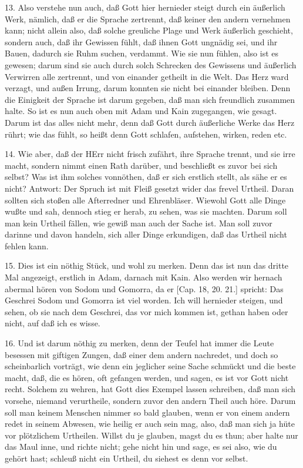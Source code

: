 13. Also verstehe nun auch, daß Gott hier hernieder steigt durch ein äußerlich Werk, nämlich, daß er die Sprache zertrennt, daß keiner den andern vernehmen kann; nicht allein also, daß solche greuliche Plage und Werk äußerlich geschieht, sondern auch, daß ihr Gewissen fühlt, daß ihnen Gott ungnädig sei, und ihr Bauen, dadurch sie Ruhm suchen, verdammt. Wie sie nun fühlen, also ist es gewesen; darum sind sie auch durch solch Schrecken des Gewissens und äußerlich Verwirren alle zertrennt, und von einander getheilt in die Welt. Das Herz ward verzagt, und außen Irrung, darum konnten sie nicht bei einander bleiben. Denn die Einigkeit der Sprache ist darum gegeben, daß man sich freundlich zusammen halte. So ist es nun auch oben mit Adam und Kain zugegangen, wie gesagt. Darum ist das alles nicht mehr, denn daß Gott durch äußerliche Werke das Herz rührt; wie das fühlt, so heißt denn Gott schlafen, aufstehen, wirken, reden etc.

14. Wie aber, daß der HErr nicht frisch zufährt, ihre Sprache trennt, und sie irre macht, sondern nimmt einen Rath darüber, und beschließt es zuvor bei sich selbst? Was ist ihm solches vonnöthen, daß er sich erstlich stellt, als sähe er es nicht? Antwort: Der Spruch ist mit Fleiß gesetzt wider das frevel Urtheil. Daran sollten sich stoßen alle Afterredner und Ehrenbläser. Wiewohl Gott alle Dinge wußte und sah, dennoch stieg er herab, zu sehen, was sie machten. Darum soll man kein Urtheil fällen, wie gewiß man auch der Sache ist. Man soll zuvor darinne und davon handeln, sich aller Dinge erkundigen, daß das Urtheil nicht fehlen kann.

15. Dies ist ein nöthig Stück, und wohl zu merken. Denn das ist nun das dritte Mal angezeigt, erstlich in Adam, darnach mit Kain. Also werden wir hernach abermal hören von Sodom und Gomorra, da er [Cap. 18, 20. 21.] spricht: Das Geschrei Sodom und Gomorra ist viel worden. Ich will hernieder steigen, und sehen, ob sie nach dem Geschrei, das vor mich kommen ist, gethan haben oder nicht, auf daß ich es wisse.

16. Und ist darum nöthig zu merken, denn
der Teufel hat immer die Leute besessen mit giftigen Zungen, daß einer dem andern nachredet, und doch so scheinbarlich vorträgt, wie denn ein jeglicher seine Sache schmückt und die beste macht, daß, die es hören, oft gefangen werden, und sagen, es ist vor Gott nicht recht. Solchem zu wehren, hat Gott dies Exempel lassen schreiben, daß man sich vorsehe, niemand verurtheile, sondern zuvor den andern Theil auch höre. Darum soll man keinem Menschen nimmer so bald glauben, wenn er von einem andern redet in seinem Abwesen, wie heilig er auch sein mag, also, daß man sich ja hüte vor plötzlichem Urtheilen. Willst du je glauben, magst du es thun; aber halte nur das Maul inne, und richte nicht; gehe nicht hin und sage, es sei also, wie du gehört hast; schleuß nicht ein Urtheil, du siehest es denn vor selbst.


